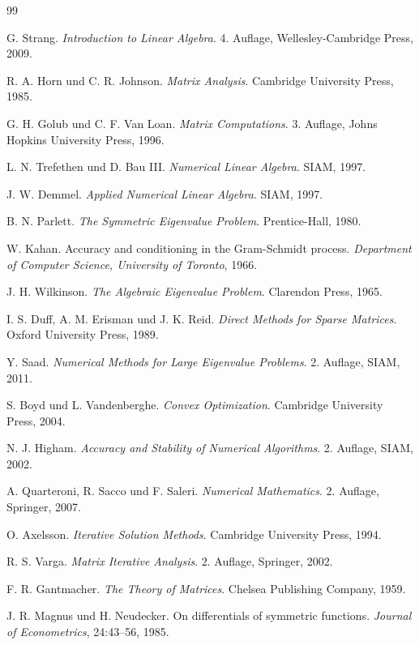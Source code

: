 \documentclass[a4paper,12pt]{article}
\theoremstyle{definition}
\begin{document}
\begin{thebibliography}{99}

G. Strang. \textit{Introduction to Linear Algebra}. 4. Auflage, Wellesley-Cambridge Press, 2009.

R. A. Horn und C. R. Johnson. \textit{Matrix Analysis}. Cambridge University Press, 1985.

G. H. Golub und C. F. Van Loan. \textit{Matrix Computations}. 3. Auflage, Johns Hopkins University Press, 1996.

L. N. Trefethen und D. Bau III. \textit{Numerical Linear Algebra}. SIAM, 1997.

J. W. Demmel. \textit{Applied Numerical Linear Algebra}. SIAM, 1997.

B. N. Parlett. \textit{The Symmetric Eigenvalue Problem}. Prentice-Hall, 1980.

W. Kahan. Accuracy and conditioning in the Gram-Schmidt process. \textit{Department of Computer Science, University of Toronto}, 1966.

J. H. Wilkinson. \textit{The Algebraic Eigenvalue Problem}. Clarendon Press, 1965.

I. S. Duff, A. M. Erisman und J. K. Reid. \textit{Direct Methods for Sparse Matrices}. Oxford University Press, 1989.

Y. Saad. \textit{Numerical Methods for Large Eigenvalue Problems}. 2. Auflage, SIAM, 2011.

S. Boyd und L. Vandenberghe. \textit{Convex Optimization}. Cambridge University Press, 2004.

N. J. Higham. \textit{Accuracy and Stability of Numerical Algorithms}. 2. Auflage, SIAM, 2002.

A. Quarteroni, R. Sacco und F. Saleri. \textit{Numerical Mathematics}. 2. Auflage, Springer, 2007.

O. Axelsson. \textit{Iterative Solution Methods}. Cambridge University Press, 1994.

R. S. Varga. \textit{Matrix Iterative Analysis}. 2. Auflage, Springer, 2002.

F. R. Gantmacher. \textit{The Theory of Matrices}. Chelsea Publishing Company, 1959.

J. R. Magnus und H. Neudecker. On differentials of symmetric functions. \textit{Journal of Econometrics}, 24:43--56, 1985.


\end{thebibliography}
\end{document}
